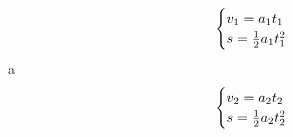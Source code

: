 \begin{equation} \begin{cases}v_{1}=a_1 t_{1}\\ s=\frac{1}{2}a_{1} t_{1}^{2}\\ \end{cases}\ \\  \end{equation}
a
\begin{equation} \begin{cases}v_{2}=a_2 t_{2}\\ s=\frac{1}{2}a_{2} t_{2}^{2}\\ \end{cases}\ \\  \end{equation}